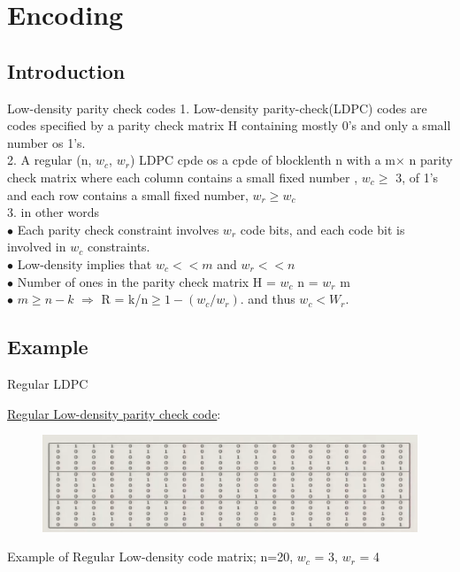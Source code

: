 \section{Encoding}
\subsection{Introduction}
\begin{frame}{Low-density parity check codes}
 1. Low-density parity-check(LDPC) codes are codes specified by a parity check matrix H containing mostly 0's and only a small number os 1's.\\
 2. A regular (n, $w_c$, $w_r$) LDPC cpde os a cpde of blocklenth n with a m$\times$ n parity check matrix where each column contains a small fixed number , $w_c \geq$ 3, of 1's and each row contains a small fixed number,  $w_r \geq w_c$\\
3. in other words\\
$\bullet$ Each parity check constraint involves $w_r$ code bits, and each code bit is involved in $w_c$ constraints.\\
$\bullet$ Low-density implies that $w_c <<  m $ and $ w_r <<  n $\\
$\bullet$ Number of ones in the parity check matrix  H = $w_c$ n = $w_r$ m \\
$\bullet$ $m\geq n-k $ \;\;$\Rightarrow$\;\; R = k/n\;$\geq 1 -(w_c / w_r)$. and thus $w_c < W_r$.
\end{frame}
\subsection{Example}

\begin{frame}{Regular LDPC}

\begin{exampleblock}{\underline{Regular Low-density parity check code}:}

\begin{figure}
			\includegraphics[width=\textwidth]{encoding/R LDPC.png}
		\end{figure}
\end{exampleblock}
Example of Regular Low-density  code matrix; n=20, $w_c$ = 3,  $w_r$ = 4   
\end{frame}

